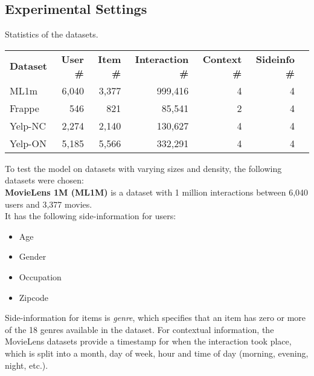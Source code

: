 \subsection{Experimental Settings}
\begin{adjustwidth}{-2.5 cm}{-2.5 cm}\centering
\begin{threeparttable}[!htb]
\caption{Statistics of the datasets.}\label{tab:datasetstats}
\scriptsize
\begin{tabular}{lrrrrrr}\toprule
\textbf{Dataset} &\textbf{User \#} &\textbf{Item \#} &\textbf{Interaction \#} &\textbf{Context \#} &\textbf{Sideinfo \#} \\\cmidrule{1-6}
ML1m &6,040 &3,377 &999,416 &4 &4 \\\cmidrule{1-6}
Frappe &546 & 821 &85,541 &2 &4 \\\cmidrule{1-6}
Yelp-NC &2,274 &2,140 &130,627 &4 &4 \\\cmidrule{1-6}
Yelp-ON &5,185 &5,566 &332,291 &4 &4 \\\midrule
\bottomrule
\end{tabular}
\end{threeparttable}
\end{adjustwidth}
To test the model on datasets with varying sizes and density, the following datasets were chosen:\\
\textbf{MovieLens 1M (ML1M)} is a dataset with 1 million interactions between 6,040 users and 3,377 movies.\\
It has the following side-information for users:
\begin{itemize}
    \item Age
    \item Gender
    \item Occupation
    \item Zipcode
\end{itemize}
Side-information for items is \textit{genre}, which specifies that an item has zero or more of the 18 genres available in the dataset.
For contextual information, the MovieLens datasets provide a timestamp for when the interaction took place, which is split into a month, day of week, hour and time of day (morning, evening, night, etc.).\\\\

